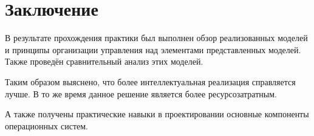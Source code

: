 \newpage
\section{Заключение}
	В результате прохождения практики был выполнен обзор реализованных моделей и принципы организации управления
		над элементами представленных моделей. Также проведён сравнительный анализ этих моделей.

	Таким образом выяснено, что более интеллектуальная реализация справляется лучше.
		В то же время данное решение является более ресурсозатратным.

	А также получены практические навыки в проектировании основные компоненты операционных систем.
